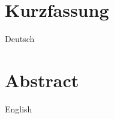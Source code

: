 \thispagestyle{plain}

\section*{Kurzfassung}
Deutsch

\section*{Abstract}
\begin{english}
English
\end{english}
